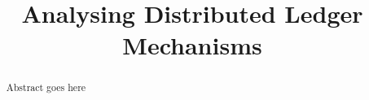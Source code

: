 \documentclass[conference]{IEEEtran}
\begin{document}

\title{Analysing Distributed Ledger Mechanisms}



\maketitle


\begin{abstract}
Abstract goes here
\end{abstract}







   

    







\end{document}
